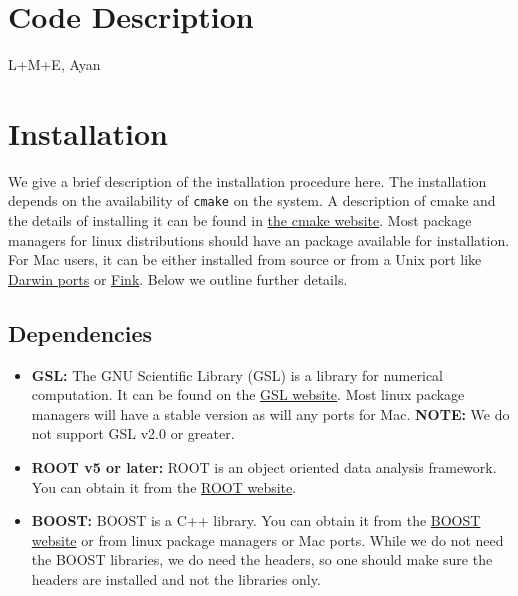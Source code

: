 \documentclass[preprint,3p,12pt]{elsarticle}
\begin{document}
{%
\section{Code Description}
\label{sec:Code}

L+M+E, Ayan


\newpage

\section{Installation}
\label{sec:Installation}

We give a brief description of the installation procedure here. The installation depends on the availability of \texttt{cmake} on the system. A description of cmake and the details of installing it can be found in \href{https://cmake.org/}{the cmake website}. Most package managers for linux distributions should have an package available for installation. For Mac users, it can be either installed from source or from a Unix port like \href{https://www.macports.org/}{Darwin ports} or \href{http://www.finkproject.org/}{Fink}. Below we outline further details. 

\subsection{Dependencies}

\begin{itemize}
\item {\bf GSL:}  The GNU Scientific Library (GSL) is a library for numerical computation. It can be found on the \href{http://www.gnu.org/software/gsl/}{GSL website}. Most linux package managers will have a stable version as will any ports for Mac. {\bf NOTE:} We do not support GSL v2.0 or greater. 

\item {\bf ROOT v5 or later:}  ROOT is an object oriented data analysis framework. You can obtain it from the \href{http://root.cern.ch/}{ROOT website}.

\item {\bf BOOST:}  BOOST is a C++ library. You can obtain it from the \href{http://www.boost.org}{BOOST website} or from linux package managers or Mac ports. While we do not need the BOOST libraries, we do need the headers, so one should make sure the headers are installed and not the libraries only. 


\end{itemize}}
\end{document}
